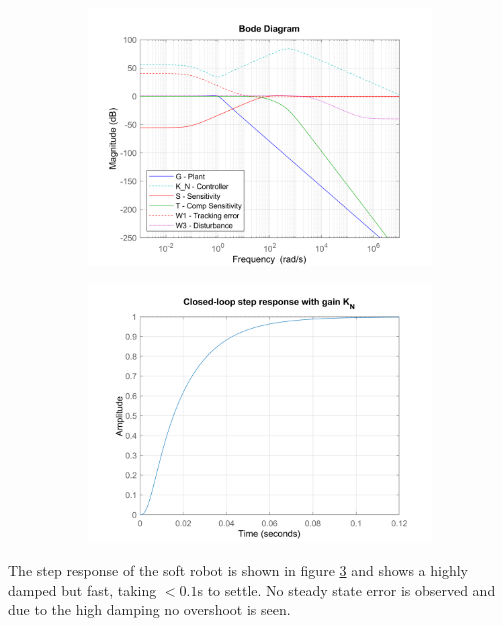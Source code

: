 \documentclass{article}
\begin{document}
\begin{figure}[H]
    \centering
    \begin{subfigure}{0.45\textwidth}
        \centering
        \includegraphics[width=\textwidth]{figures/K_N_bode.png}
        \caption{}
        \label{fig:K_N_bode}
    \end{subfigure}
    \begin{subfigure}{0.45\textwidth}
        \centering
        \includegraphics[width=\textwidth]{figures/K_N_step.png}
        \caption{}
        \label{fig:K_N_step}
    \end{subfigure}
\end{figure}

The step response of the soft robot is shown in figure \ref{fig:K_N_step} and shows a highly damped but fast, taking $<0.1$s to settle.
No steady state error is observed and due to the high damping no overshoot is seen.
\end{document}
